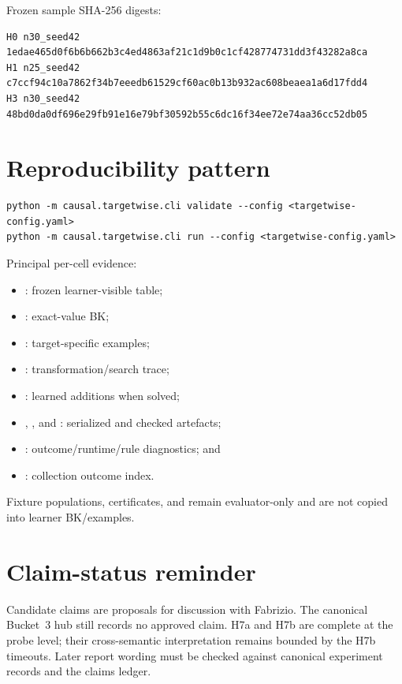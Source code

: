 \documentclass[11pt]{article}
\begin{document}
Frozen sample SHA-256 digests:

\begin{lstlisting}[basicstyle=\ttfamily\footnotesize]
H0 n30_seed42
1edae465d0f6b6b662b3c4ed4863af21c1d9b0c1cf428774731dd3f43282a8ca
H1 n25_seed42
c7ccf94c10a7862f34b7eeedb61529cf60ac0b13b932ac608beaea1a6d17fdd4
H3 n30_seed42
48bd0da0df696e29fb91e16e79bf30592b55c6dc16f34ee72e74aa36cc52db05
\end{lstlisting}

\section{Reproducibility pattern}

\begin{lstlisting}
python -m causal.targetwise.cli validate --config <targetwise-config.yaml>
python -m causal.targetwise.cli run --config <targetwise-config.yaml>
\end{lstlisting}

Principal per-cell evidence:
\begin{itemize}
  \item {}: frozen learner-visible table;
  \item {}: exact-value BK;
  \item {}: target-specific examples;
  \item {}: transformation/search trace;
  \item {}: learned additions when solved;
  \item {}, , and
  : serialized and checked artefacts;
  \item {}: outcome/runtime/rule diagnostics; and
  \item {}: collection outcome index.
\end{itemize}

Fixture populations, certificates, and  remain
evaluator-only and are not copied into learner BK/examples.

\section{Claim-status reminder}

Candidate claims are proposals for discussion with Fabrizio. The canonical
Bucket~3 hub still records no approved claim. H7a and H7b are complete at the
probe level; their cross-semantic interpretation remains bounded by the H7b
timeouts. Later report wording must be checked against canonical experiment
records and the claims ledger.
\end{document}
